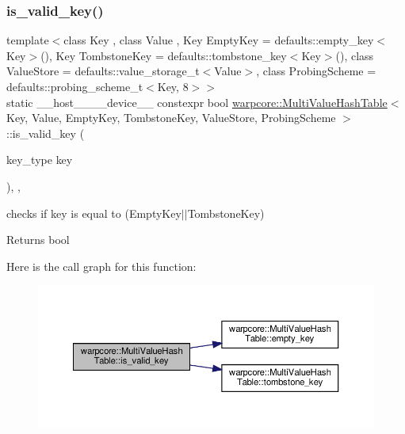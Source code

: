 \subsubsection{\texorpdfstring{is\+\_\+valid\+\_\+key()}{is\_valid\_key()}}
{\footnotesize\ttfamily template$<$class Key , class Value , Key Empty\+Key = defaults\+::empty\+\_\+key$<$\+Key$>$(), Key Tombstone\+Key = defaults\+::tombstone\+\_\+key$<$\+Key$>$(), class Value\+Store  = defaults\+::value\+\_\+storage\+\_\+t$<$\+Value$>$, class Probing\+Scheme  = defaults\+::probing\+\_\+scheme\+\_\+t$<$\+Key, 8$>$$>$ \\
static \+\_\+\+\_\+host\+\_\+\+\_\+\+\_\+\+\_\+device\+\_\+\+\_\+ constexpr bool \hyperlink{classwarpcore_1_1MultiValueHashTable}{warpcore\+::\+Multi\+Value\+Hash\+Table}$<$ Key, Value, Empty\+Key, Tombstone\+Key, Value\+Store, Probing\+Scheme $>$\+::is\+\_\+valid\+\_\+key (\begin{DoxyParamCaption}\item[{key\+\_\+type}]{key }\end{DoxyParamCaption})\hspace{0.3cm}{\ttfamily [inline]}, {\ttfamily [static]}, {\ttfamily [noexcept]}}



checks if {\ttfamily key} is equal to {\ttfamily }(Empty\+Key$\vert$$\vert$\+Tombstone\+Key) 

\begin{DoxyReturn}{Returns}
{\ttfamily bool} 
\end{DoxyReturn}
Here is the call graph for this function\+:
\nopagebreak
\begin{figure}[H]
\begin{center}
\leavevmode
\includegraphics[width=350pt]{classwarpcore_1_1MultiValueHashTable_a65e099a2eea8ca9b800d02937b6c66a8_cgraph}
\end{center}
\end{figure}
\mbox{\label{classwarpcore_1_1MultiValueHashTable_aabaa179a3e1b49f37f1a23adb0b33092}} 
